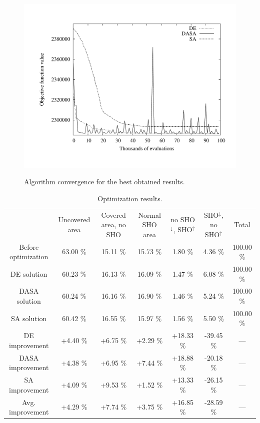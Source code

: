 \begin{figure}
\centering

\includegraphics[width=1\columnwidth]{07-experimental_evaluation-sho_balancing/img/convergence}\\\vskip -0.3in

\caption{Algorithm convergence for the best obtained results.\label{fig:algorithm_convergence}}
\end{figure}


\begin{table}
\centering

\caption{Optimization results.\textit{\label{tab:optimization-results}}}


\begin{tabular}{ccccccc}
\toprule 
 & Uncovered area & Covered area, no SHO & Normal SHO area & no SHO$^{\downarrow}$, SHO$^{\uparrow}$ & SHO$^{\downarrow}$, no SHO$^{\uparrow}$ & Total\tabularnewline\addlinespace
\midrule
Before optimization & 63.00 \% & 15.11 \% & 15.73 \% & 1.80 \% & 4.36 \% & 100.00 \%\tabularnewline
\cmidrule{2-7} 
DE solution & 60.23 \% & 16.13 \% & 16.09 \% & 1.47 \% & 6.08 \% & 100.00 \%\tabularnewline
DASA solution & 60.24 \% & 16.16 \% & 16.90 \% & 1.46 \% & 5.24 \% & 100.00 \%\tabularnewline
SA solution & 60.42 \% & 16.55 \% & 15.97 \% & 1.56 \% & 5.50 \% & 100.00 \%\tabularnewline
\cmidrule{2-7} 
DE improvement & +4.40 \% & +6.75 \% & +2.29 \% & +18.33 \% & -39.45 \% & ---\tabularnewline
DASA improvement & +4.38 \% & +6.95 \% & +7.44 \% & +18.88 \% & -20.18 \% & ---\tabularnewline
SA improvement & +4.09 \% & +9.53 \% & +1.52 \% & +13.33 \% & -26.15 \% & ---\tabularnewline
\cmidrule{2-7} 
Avg. improvement & +4.29 \% & +7.74 \% & +3.75 \% & +16.85 \% & -28.59 \% & ---\tabularnewline
\bottomrule
\end{tabular}
\end{table}


